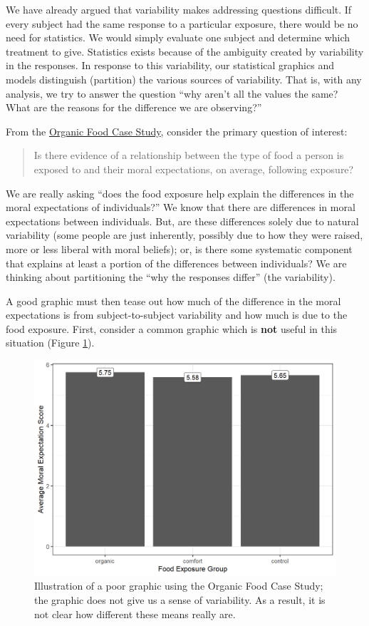 \documentclass[
]{book}
\theoremstyle{plain}
\theoremstyle{mydefn}
\theoremstyle{myexmpl}
\theoremstyle{remark}
\begin{document}
We have already argued that variability makes addressing questions difficult. If every subject had the same response to a particular exposure, there would be no need for statistics. We would simply evaluate one subject and determine which treatment to give. Statistics exists because of the ambiguity created by variability in the responses. In response to this variability, our statistical graphics and models distinguish (partition) the various sources of variability. That is, with any analysis, we try to answer the question ``why aren't all the values the same? What are the reasons for the difference we are observing?''

From the \protect\hyperlink{CaseOrganic}{Organic Food Case Study}, consider the primary question of interest:

\begin{quote}
Is there evidence of a relationship between the type of food a person is exposed to and their moral expectations, on average, following exposure?
\end{quote}

We are really asking ``does the food exposure help explain the differences in the moral expectations of individuals?'' We know that there are differences in moral expectations between individuals. But, are these differences solely due to natural variability (some people are just inherently, possibly due to how they were raised, more or less liberal with moral beliefs); or, is there some systematic component that explains at least a portion of the differences between individuals? We are thinking about partitioning the ``why the responses differ'' (the variability).

A good graphic must then tease out how much of the difference in the moral expectations is from subject-to-subject variability and how much is due to the food exposure. First, consider a common graphic which is \textbf{not} useful in this situation (Figure \ref{fig:anovasummaries-bad-bar}).

\begin{figure}

{\centering \includegraphics[width=0.8\linewidth]{./Images/anovasummaries-bad-bar-1} 

}

\caption{Illustration of a poor graphic using the Organic Food Case Study; the graphic does not give us a sense of variability.  As a result, it is not clear how different these means really are.}\label{fig:anovasummaries-bad-bar}
\end{figure}
\end{document}
